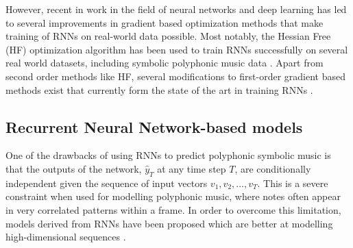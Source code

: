 	However, recent in work in the field of neural networks and deep learning has led to several improvements in gradient based optimization methods that make training of RNNs on real-world data possible. Most notably, the Hessian Free (HF) optimization algorithm has been used to train RNNs successfully on several real world datasets, including symbolic polyphonic music data \cite{Martens2011}. Apart from second order methods like HF, several modifications to first-order gradient based methods exist that currently form the state of the art in training RNNs \cite{bengio2012advances}. 
%


	\subsection{Recurrent Neural Network-based models}
	\label{subsec:rnn-based}
	One of the drawbacks of using RNNs to predict polyphonic symbolic music is that the outputs of the network, $\hat{y}_T$ at any time step $T$,  are conditionally independent given the sequence of input vectors $v_1, v_2, \ldots, v_T$. This is a severe constraint when used for modelling polyphonic music, where notes often appear in very correlated patterns within a frame. In order to overcome this limitation, models derived from RNNs have been proposed which are better at modelling high-dimensional sequences \cite{sutskever2008recurrent,Boulanger-Lewandowski2012}.

